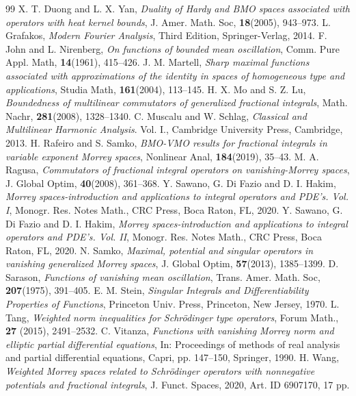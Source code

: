 \documentclass[10pt, reqno]{amsart}
\theoremstyle{definition}
\theoremstyle{remark}
\numberwithin{equation}{section}
\begin{document}
\begin{thebibliography}{99}
X. T. Duong and L. X. Yan, \emph{Duality of Hardy and BMO spaces associated with operators with heat kernel bounds}, J. Amer. Math. Soc, \textbf{18}(2005), 943--973.
L. Grafakos, \emph{Modern Fourier Analysis}, Third Edition, Springer-Verlag, 2014.
F. John and L. Nirenberg, \emph{On functions of bounded mean oscillation}, Comm. Pure Appl. Math, \textbf{14}(1961), 415--426.
J. M. Martell, \emph{Sharp maximal functions associated with approximations of the identity in spaces of homogeneous type and applications}, Studia Math, \textbf{161}(2004), 113--145.
H. X. Mo and S. Z. Lu, \emph{Boundedness of multilinear commutators of generalized fractional integrals}, Math. Nachr, \textbf{281}(2008), 1328--1340.
C. Muscalu and W. Schlag, \emph{Classical and Multilinear Harmonic Analysis}. Vol. I., Cambridge University Press, Cambridge, 2013.
H. Rafeiro and S. Samko, \emph{BMO-VMO results for fractional integrals in variable exponent Morrey spaces}, Nonlinear Anal, \textbf{184}(2019), 35--43.
M. A. Ragusa, \emph{Commutators of fractional integral operators on vanishing-Morrey spaces}, J. Global Optim, \textbf{40}(2008), 361--368.
Y. Sawano, G. Di Fazio and D. I. Hakim, \emph{Morrey spaces-introduction and applications to integral operators and PDE's. Vol. I}, Monogr. Res. Notes Math., CRC Press, Boca Raton, FL, 2020.
Y. Sawano, G. Di Fazio and D. I. Hakim, \emph{Morrey spaces-introduction and applications to integral operators and PDE's. Vol. II}, Monogr. Res. Notes Math., CRC Press, Boca Raton, FL, 2020.
N. Samko, \emph{Maximal, potential and singular operators in vanishing generalized Morrey spaces}, J. Global Optim, \textbf{57}(2013), 1385--1399.
D. Sarason, \emph{Functions of vanishing mean oscillation}, Trans. Amer. Math. Soc, \textbf{207}(1975), 391--405.
E. M. Stein, \emph{Singular Integrals and Differentiability Properties of Functions}, Princeton Univ. Press, Princeton, New Jersey, 1970.
L. Tang, \emph{Weighted norm inequalities for Schr\"odinger type operators}, Forum Math., \textbf{27} (2015), 2491--2532.
C. Vitanza, \emph{Functions with vanishing Morrey norm and elliptic partial differential equations}, In: Proceedings of methods of real analysis and partial differential equations, Capri, pp. 147--150, Springer, 1990.
H. Wang, \emph{Weighted Morrey spaces related to Schr\"{o}dinger operators with nonnegative potentials and fractional integrals}, J. Funct. Spaces, 2020, Art. ID 6907170, 17 pp.

\end{thebibliography}
\end{document}

